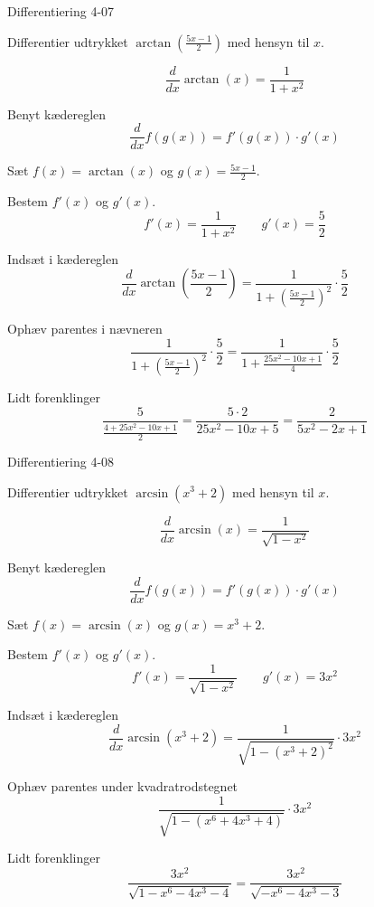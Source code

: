 \documentclass{article}
\begin{document}
\begin{exercise}{Differentiering 4-07}

Differentier udtrykket $\arctan\left( \frac{5 x - 1}{2} \right)$ med hensyn til $x$.


\hint
\[
\frac{d}{dx} \arctan(x) = \frac{1}{1 + x^ 2}
\]


\hint
Benyt kædereglen
\[
\frac{d}{dx} f(g(x)) = f'(g(x)) \cdot g'(x)
\]

\hint
Sæt $f(x) = \arctan(x)$ og $g(x) = \frac{5x - 1}{2}$.

\hint
Bestem $f'(x)$ og $g'(x)$.
\[
f'(x) = \frac{1}{1 + x^ 2} \qquad g'(x) = \frac{5}{2}
\]

\hint
Indsæt i kædereglen
\[
\frac{d}{dx} \arctan\left( \frac{5x - 1}{2} \right) = \frac{1}{1 + \left( \frac{5x - 1}{2} \right)^2} \cdot \frac{5}{2}
\]

\hint
Ophæv parentes i nævneren
\[
\frac{1}{1 + \left( \frac{5x - 1}{2} \right)^2} \cdot \frac{5}{2} = \frac{1}{1 + \frac{25x^2 - 10 x + 1}{4}} \cdot \frac{5}{2}
\]

\hint
Lidt forenklinger
\[
\frac{5}{\frac{4 + 25x^2 - 10 x + 1}{2}} = \frac{5 \cdot 2}{ 25x^2 - 10 x + 5} = \frac{2}{5x^2 - 2 x + 1}
 \]
\end{exercise}

\begin{exercise}{Differentiering 4-08}

Differentier udtrykket $\arcsin\left( x^3 + 2\right)$ med hensyn til $x$.


\hint
\[
\frac{d}{dx} \arcsin(x) = \frac{1}{\sqrt{1 - x^2}}
\]


\hint
Benyt kædereglen
\[
\frac{d}{dx} f(g(x)) = f'(g(x)) \cdot g'(x)
\]

\hint
Sæt $f(x) = \arcsin(x)$ og $g(x) = x^3 + 2$.

\hint
Bestem $f'(x)$ og $g'(x)$.
\[
f'(x) = \frac{1}{\sqrt{1 - x^2}} \qquad g'(x) = 3x^2
\]

\hint
Indsæt i kædereglen
\[
\frac{d}{dx} \arcsin\left( x^3 + 2\right) = \frac{1}{\sqrt{1 - \left( x^3 + 2 \right)^2}} \cdot 3x^2
\]

\hint
Ophæv parentes under kvadratrodstegnet
\[
\frac{1}{\sqrt{1 - (x^6 + 4x^3 + 4)}} \cdot 3x^2
\]

\hint
Lidt forenklinger
\[
\frac{3x^2}{\sqrt{1 - x^6 - 4x^3 - 4}} = \frac{3x^2}{\sqrt{-x^6 - 4x^3 - 3}}
\]
\end{exercise}
\end{document}
